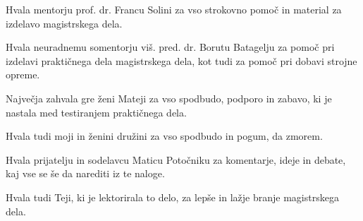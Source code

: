 Hvala mentorju prof. dr. Francu Solini za vso strokovno pomoč in material za izdelavo magistrskega dela.

Hvala neuradnemu somentorju viš. pred. dr. Borutu Batagelju za pomoč pri izdelavi praktičnega dela magistrskega dela, kot tudi za pomoč pri dobavi strojne opreme.

Največja zahvala gre ženi Mateji za vso spodbudo, podporo in zabavo, ki je nastala med testiranjem praktičnega dela.

Hvala tudi moji in ženini družini za vso spodbudo in pogum, da zmorem.

Hvala prijatelju in sodelavcu Maticu Potočniku za komentarje, ideje in debate, kaj vse se še da narediti iz te naloge.

Hvala tudi Teji, ki je lektorirala to delo, za lepše in lažje branje magistrskega dela.
